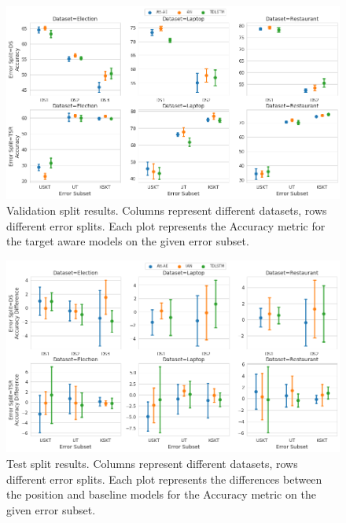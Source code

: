 \begin{figure}[!h]
    \centering
    \includegraphics[scale=0.3]{images/augmentation/methods_performance/Inter_Target/inter_target_encoding_split_overall_validation.png}
    \caption{Validation split results. Columns represent different datasets, rows different error splits. Each plot represents the Accuracy metric for the target aware models on the given error subset.}
    \label{fig:aug_inter_target_encoding_split_overall_validation}
\end{figure}

\begin{figure}[!h]
    \centering
    \includegraphics[scale=0.3]{images/augmentation/methods_performance/Inter_Target/inter_target_encoding_split_overall_diff_test.png}
    \caption{Test split results. Columns represent different datasets, rows different error splits. Each plot represents the differences between the position and baseline models for the Accuracy metric on the given error subset.}
    \label{fig:aug_inter_target_encoding_split_overall_diff_test}
\end{figure}

